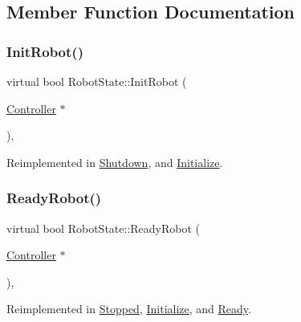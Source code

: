 \subsection{Member Function Documentation}
\mbox{\label{class_robot_state_a5087ea1ba96b9aad623fe52bbb249b41}} 
\subsubsection{\texorpdfstring{InitRobot()}{InitRobot()}}
{\footnotesize\ttfamily virtual bool Robot\+State\+::\+Init\+Robot (\begin{DoxyParamCaption}\item[{\mbox{\hyperlink{class_controller}{Controller}} $\ast$}]{ }\end{DoxyParamCaption})\hspace{0.3cm}{\ttfamily [inline]}, {\ttfamily [virtual]}}



Reimplemented in \mbox{\hyperlink{class_shutdown_a56ba69711c5d716717ce511f6ab3ec99}{Shutdown}}, and \mbox{\hyperlink{class_initialize_afaeae9e331da4559ae27c7c1f22d92df}{Initialize}}.

\mbox{\label{class_robot_state_a1e8e2842a62f2666b3c687ec090a3b4f}} 
\subsubsection{\texorpdfstring{ReadyRobot()}{ReadyRobot()}}
{\footnotesize\ttfamily virtual bool Robot\+State\+::\+Ready\+Robot (\begin{DoxyParamCaption}\item[{\mbox{\hyperlink{class_controller}{Controller}} $\ast$}]{ }\end{DoxyParamCaption})\hspace{0.3cm}{\ttfamily [inline]}, {\ttfamily [virtual]}}



Reimplemented in \mbox{\hyperlink{class_stopped_ac47fcf352b8724dd41de6a5db7976b88}{Stopped}}, \mbox{\hyperlink{class_initialize_ab6682470e76cf6ff4b3e75707096dac9}{Initialize}}, and \mbox{\hyperlink{class_ready_abc21fdcc13ef0bd14361cdd1b2cd73a6}{Ready}}.

